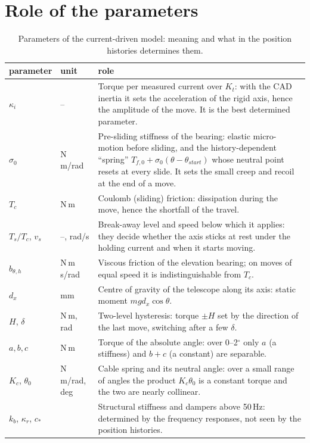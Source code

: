 \documentclass[10pt,a4paper]{article}
\numberwithin{equation}{section}
\begin{document}
\section{Role of the parameters}\label{sec:roles}
\begin{table}[H]\centering\small
\caption{Parameters of the current-driven model: meaning and what in the position histories determines them.}\label{tab:roles}
\begin{tabularx}{\linewidth}{lL{2.0cm}Y}\toprule
parameter & unit & role \\ \midrule
$\kappa_i$ & -- & Torque per measured current over $K_t$: with the CAD inertia it sets the acceleration of the rigid axis, hence the amplitude of the move. It is the best determined parameter. \\
$\sigma_0$ & N\,m/rad & Pre-sliding stiffness of the bearing: elastic micro-motion before sliding, and the history-dependent ``spring'' $T_{f,0}+\sigma_0(\theta-\theta_{start})$ whose neutral point resets at every slide. It sets the small creep and recoil at the end of a move. \\
$T_c$ & N\,m & Coulomb (sliding) friction: dissipation during the move, hence the shortfall of the travel. \\
$T_s/T_c$, $v_s$ & --, rad/s & Break-away level and speed below which it applies: they decide whether the axis sticks at rest under the holding current and when it starts moving. \\
$b_{\theta,h}$ & N\,m\,s/rad & Viscous friction of the elevation bearing; on moves of equal speed it is indistinguishable from $T_c$. \\
$d_x$ & mm & Centre of gravity of the telescope along its axis: static moment $m g d_x\cos\theta$. \\
$H$, $\delta$ & N\,m, rad & Two-level hysteresis: torque $\pm H$ set by the direction of the last move, switching after a few $\delta$. \\
$a,b,c$ & N\,m & Torque of the absolute angle: over 0--2$^\circ$ only $a$ (a stiffness) and $b+c$ (a constant) are separable. \\
$K_c$, $\theta_0$ & N\,m/rad, deg & Cable spring and its neutral angle: over a small range of angles the product $K_c\theta_0$ is a constant torque and the two are nearly collinear. \\
$k_b$, $\kappa_r$, $c_*$ & & Structural stiffness and dampers above 50\,Hz: determined by the frequency responses, not seen by the position histories. \\ \bottomrule
\end{tabularx}\end{table}
\end{document}
